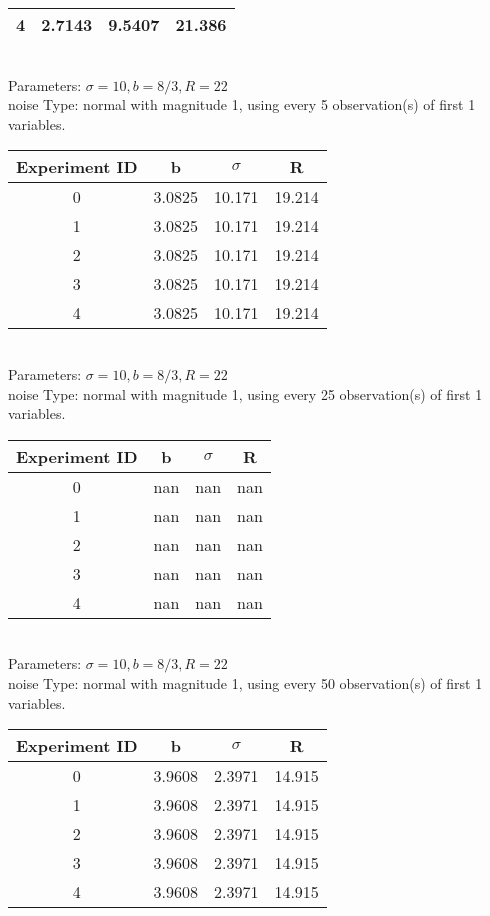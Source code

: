 \begin{multicols}{3}
\begin{tabular}{cccc}
 4 & 2.7143 & 9.5407 & 21.386\\ \hline 
 \end{tabular}\\
Parameters: $\sigma=10, b=8/3, R=22$\\
noise Type: normal with magnitude 1, using every 5 observation(s) of first 1 variables.\\
\begin{tabular}{cccc}
\hline Experiment ID & b & $\sigma$ & R \\ \hline 
0 & 3.0825 & 10.171 & 19.214\\ \hline 
 1 & 3.0825 & 10.171 & 19.214\\ \hline 
 2 & 3.0825 & 10.171 & 19.214\\ \hline 
 3 & 3.0825 & 10.171 & 19.214\\ \hline 
 4 & 3.0825 & 10.171 & 19.214\\ \hline 
 \end{tabular}\\
Parameters: $\sigma=10, b=8/3, R=22$\\
noise Type: normal with magnitude 1, using every 25 observation(s) of first 1 variables.\\
\begin{tabular}{cccc}
\hline Experiment ID & b & $\sigma$ & R \\ \hline 
0 & nan & nan & nan\\ \hline 
 1 & nan & nan & nan\\ \hline 
 2 & nan & nan & nan\\ \hline 
 3 & nan & nan & nan\\ \hline 
 4 & nan & nan & nan\\ \hline 
 \end{tabular}\\
Parameters: $\sigma=10, b=8/3, R=22$\\
noise Type: normal with magnitude 1, using every 50 observation(s) of first 1 variables.\\
\begin{tabular}{cccc}
\hline Experiment ID & b & $\sigma$ & R \\ \hline 
0 & 3.9608 & 2.3971 & 14.915\\ \hline 
 1 & 3.9608 & 2.3971 & 14.915\\ \hline 
 2 & 3.9608 & 2.3971 & 14.915\\ \hline 
 3 & 3.9608 & 2.3971 & 14.915\\ \hline 
 4 & 3.9608 & 2.3971 & 14.915\\ \hline 

\end{tabular}
\end{multicols}
